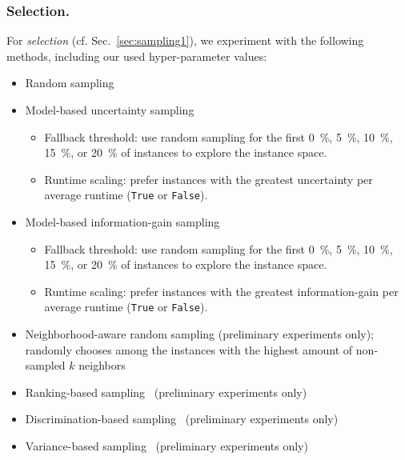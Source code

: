 \documentclass[runningheads]{llncs}
\begin{document}
\subsubsection{Selection.}
For \emph{selection} (cf. Sec.~\ref{sec:sampling1}), we experiment with the following methods, including our used hyper-parameter values:
\begin{itemize}
  \item Random sampling 
  \item Model-based uncertainty sampling
  \begin{itemize}
    \item Fallback threshold: use random sampling for the first \SI{0}{\%}, \SI{5}{\%}, \SI{10}{\%}, \SI{15}{\%}, or \SI{20}{\%} of instances to explore the instance space.
    \item Runtime scaling: prefer instances with the greatest uncertainty per average runtime (\texttt{True} or \texttt{False}).
  \end{itemize}

  \item Model-based information-gain sampling
  \begin{itemize}
    \item Fallback threshold: use random sampling for the first \SI{0}{\%}, \SI{5}{\%}, \SI{10}{\%}, \SI{15}{\%}, or \SI{20}{\%} of instances to explore the instance space.
    \item Runtime scaling: prefer instances with the greatest information-gain per average runtime (\texttt{True} or \texttt{False}).
  \end{itemize}

  \item Neighborhood-aware random sampling (preliminary experiments only); randomly chooses among the instances with the highest amount of non-sampled $k$ neighbors
  \item Ranking-based sampling~\cite{Bossek021a} (preliminary experiments only)
  \item Discrimination-based sampling~\cite{GentHJKMNN14} (preliminary experiments only)
  \item Variance-based sampling~\cite{MatriconAFSH21} (preliminary experiments only)
\end{itemize}
\end{document}
